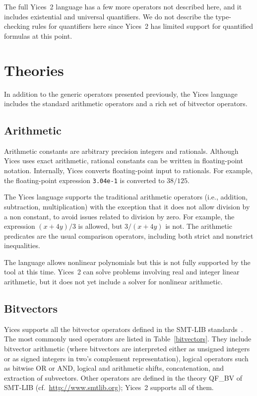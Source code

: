 \documentclass[11pt,twoside,fleqn,openright,titlepage]{cslreport}
\begin{document}
\medskip\noindent
The full Yices~2 language has a few more operators not described here,
and  it includes  existential  and universal  quantifiers.  We do  not
describe the  type-checking rules  for quantifiers here  since Yices~2
has limited support for quantified formulas at this point.


\section{Theories}

In addition  to the generic operators presented  previously, the Yices
language includes the standard arithmetic  operators and a rich set of
bitvector operators.

\subsection{Arithmetic}

Arithmetic constants  are arbitrary precision integers  and rationals.
Although  Yices  uses  exact  arithmetic, rational  constants  can  be
written  in  floating-point   notation.   Internally,  Yices  converts
floating-point input  to rationals.   For example,  the floating-point
expression \texttt{3.04e-1} is converted to $38/125$.

\medskip\noindent
The  Yices  language  supports  the traditional  arithmetic  operators
(i.e., addition, subtraction,  multiplication) with the exception that
it does not allow division by  a non constant, to avoid issues related
to  division by  zero. For  example, the  expression $(x  +  4y)/3$ is
allowed, but  $3/(x + 4y)$ is  not. The arithmetic  predicates are the
usual  comparison  operators,  including  both  strict  and  nonstrict
inequalities.

\medskip\noindent
The  language  allows nonlinear  polynomials  but  this  is not  fully
supported  by  the tool  at  this  time.  Yices~2 can  solve  problems
involving  real and  integer linear  arithmetic, but  it does  not yet
include a solver for nonlinear arithmetic.


\subsection{Bitvectors}
\label{bitvector-general}

Yices supports all the bitvector operators defined in the SMT-LIB
standards~\cite{SMTLIB12:2006,SMTLIB20:2012}.  The most commonly used
operators are listed in Table~\ref{bitvectors}.  They include
bitvector arithmetic (where bitvectors are interpreted either as
unsigned integers or as signed integers in two's complement
representation), logical operators such as bitwise OR or AND, logical
and arithmetic shifts, concatenation, and extraction of
subvectors. Other operators are defined in the theory QF\_BV of
SMT-LIB (cf.~\url{http://www.smtlib.org}); Yices~2 supports all of them.
\end{document}
